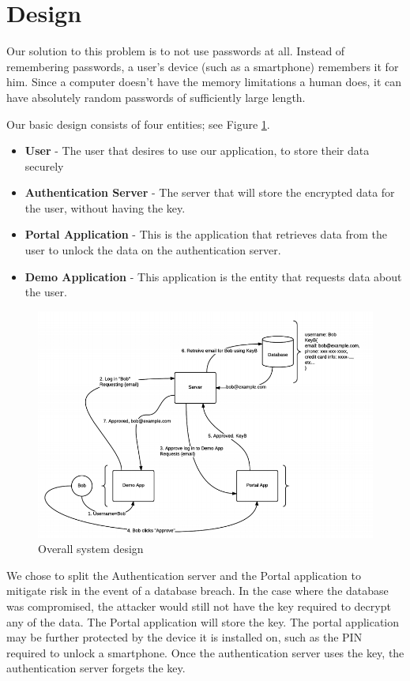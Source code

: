 \documentclass[letterpaper,twocolumn,10pt]{article}
\begin{document}
\section{Design}

Our solution to this problem is to not use passwords at all. Instead of remembering passwords, a user's device (such as a smartphone) remembers it for him. Since a computer doesn't have the memory limitations a human does, it can have absolutely random passwords of sufficiently large length. 

Our basic design consists of four entities; see Figure \ref{design}.
\begin{itemize}
    \item \textbf{User} - The user that desires to use our application, to store their data securely
    \item \textbf{Authentication Server} - The server that will store the encrypted data for the user, without having the key.
    \item \textbf{Portal Application} - This is the application that retrieves data from the user to unlock the data on the authentication server.
    \item \textbf{Demo Application} - This application is the entity that requests data about the user.
\end{itemize}

\begin{figure}[ht]
\centering
\includegraphics[width=.95\textwidth]{Design}
\caption{Overall system design}
\label{design}
\end{figure}

We chose to split the Authentication server and the Portal application to mitigate risk in the event of a database breach. In the case where the database was compromised, the attacker would still not have the key required to decrypt any of the data. The Portal application will store the key. The portal application may be further protected by the device it is installed on, such as the PIN required to unlock a smartphone. Once the authentication server uses the key, the authentication server forgets the key.
\end{document}
